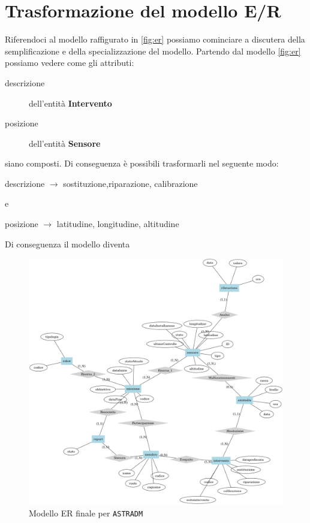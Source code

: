 \section{Trasformazione del modello E/R}
Riferendoci al modello raffigurato in \ref{fig:er} possiamo cominciare
a discutera della semplificazione e della specializzazione del
modello. Partendo dal modello \ref{fig:er} possiamo vedere come gli attributi:
\begin{description}
\item[descrizione] dell'entità \textbf{Intervento}
\item[posizione] dell'entità \textbf{Sensore}
\end{description}
siano composti. Di conseguenza è possibili trasformarli nel seguente modo:
\begin{center}
  descrizione $\rightarrow$ sostituzione,riparazione, calibrazione
\end{center}
e
\begin{center}
  posizione $\rightarrow$ latitudine, longitudine, altitudine
\end{center}

Di conseguenza il modello diventa
\begin{figure}[ht]
  \includegraphics[width=\linewidth]{images/er-finale.png}
  \caption{Modello ER finale per \texttt{ASTRADM}}
  \label{fig:er-finale}
\end{figure}
 	

